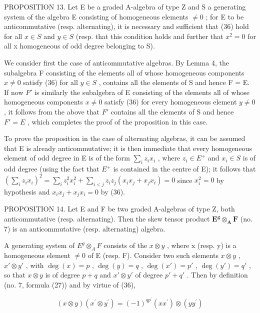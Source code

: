 PROPOSITION 13. Let E be a graded A-algebra of type Z and S a generating system of the algebra E consisting of homogeneous elements \(\neq0\) ; for E to be anticommutative (resp. alternating), it is necessary and sufficient that (36) hold for all \(x\in S\) and \(y\in S\) (resp. that this condition holds and further that \(x^{2}=0\) for all x homogeneous of odd degree belonging to S).

We consider first the case of anticommutative algebras. By Lemma 4, the subalgebra F consisting of the elements all of whose homogeneous components \(x \neq 0\) satisfy (36) for all \(y \in S\) , contains all the elements of S and hence F = E. If now \(F'\) is similarly the subalgebra of E consisting of the elements all of whose homogeneous components \(x \neq 0\) satisfy (36) for every homogeneous element \(y \neq 0\) , it follows from the above that \(F'\) contains all the elements of S and hence \(F' = E\) , which completes the proof of the proposition in this case.

To prove the proposition in the case of alternating algebras, it can be assumed that E is already anticommutative; it is then immediate that every homogeneous element of odd degree in E is of the form \(\sum_{i} z_{i} x_{i}\) , where \(z_{i} \in E^{+}\) and \(x_{i} \in S\) is of odd degree (using the fact that \(E^{+}\) is contained in the centre of E); it follows that \(\left(\sum_{i} z_{i} x_{i}\right)^{2} = \sum_{i} z_{i}^{2} x_{i}^{2} + \sum_{i < j} z_{i} z_{j} (x_{i} x_{j} + x_{j} x_{i}) = 0\) since \(x_{i}^{2} = 0\) by hypothesis and \(x_{i} x_{j} + x_{j} x_{i} = 0\) by (36).

PROPOSITION 14. Let E and F be two graded A-algebras of type Z, both anticommutative (resp. alternating). Then the skew tensor product \(\mathbf{E}^{\mathbf{g}}\otimes_{\mathbf{A}}\mathbf{F}\) (no. 7) is an anticommutative (resp. alternating) algebra.

A generating system of \(E^{g} \otimes_{A} F\) consists of the \(x \otimes y\) , where x (resp. y) is a homogeneous element \(\neq 0\) of E (resp. F). Consider two such elements \(x \otimes y\) , \(x' \otimes y'\) , with \(\deg(x) = p\) , \(\deg(y) = q\) , \(\deg(x') = p'\) , \(\deg(y') = q'\) , so that \(x \otimes y\) is of degree \(p + q\) and \(x' \otimes y'\) of degree \(p' + q'\) . Then by definition (no. 7, formula (27)) and by virtue of (36),

\[
(x \otimes y) (x ^ {\prime} \otimes y ^ {\prime}) = (- 1) ^ {q p ^ {\prime}} (x x ^ {\prime}) \otimes (y y ^ {\prime})
\]

